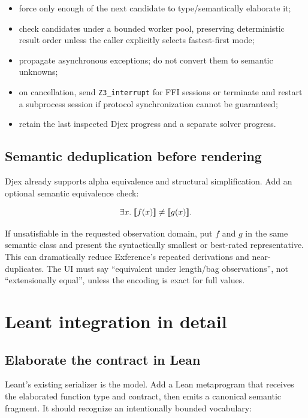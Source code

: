 \documentclass[11pt,oneside]{article}
\providecommand{\llbracket}{\mathopen{[\mkern-3mu[}}
\providecommand{\rrbracket}{\mathclose{]\mkern-3mu]}}
\newcommand{\code}[1]{\texttt{#1}}
\begin{document}
\begin{itemize}
  \item force only enough of the next candidate to type/semantically elaborate it;
  \item check candidates under a bounded worker pool, preserving deterministic result
        order unless the caller explicitly selects fastest-first mode;
  \item propagate asynchronous exceptions; do not convert them to semantic unknowns;
  \item on cancellation, send \code{Z3\_interrupt} for FFI sessions or terminate and
        restart a subprocess session if protocol synchronization cannot be guaranteed;
  \item retain the last inspected Djex progress and a separate solver progress.
\end{itemize}

\subsection{Semantic deduplication before rendering}

Djex already supports alpha equivalence and structural simplification. Add an optional
semantic equivalence check:

\[
  \exists x.\; \llbracket f(x)\rrbracket \neq \llbracket g(x)\rrbracket.
\]

If unsatisfiable in the requested observation domain, put $f$ and $g$ in the same
semantic class and present the syntactically smallest or best-rated representative.
This can dramatically reduce Exference's repeated derivations and near-duplicates.
The UI must say ``equivalent under length/bag observations'', not ``extensionally equal'',
unless the encoding is exact for full values.

\section{Leant integration in detail}

\subsection{Elaborate the contract in Lean}

Leant's existing serializer is the model. Add a Lean metaprogram that receives the
elaborated function type and contract, then emits a canonical semantic fragment. It
should recognize an intentionally bounded vocabulary:
\end{document}
